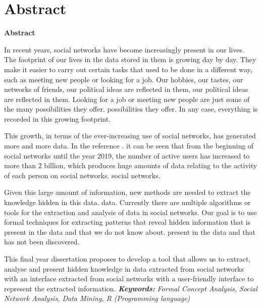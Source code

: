 \documentclass[../main.tex]{subfiles}
\begin{document}
\makeatletter
\renewenvironment{abstract}{%
    \if@twocolumn
      \section*{Abstract \\}%
    \else %
    \begin{flushright}
        {\filleft\Huge\bfseries\fontsize{48pt}{12}\selectfont Abstract\vspace{\z@}}%
        \end{flushright}
      \quotation
    \fi}
    {\if@twocolumn\else\endquotation\fi}
\makeatother
\begin{abstract}

In recent years, social networks have become increasingly present in our lives. The footprint of our lives in the data stored in them is growing day by day. They make it easier to carry out certain tasks that used to be done in a different way, such as meeting new people or looking for a job. Our hobbies, our tastes, our networks of friends, our political ideas are reflected in them, our political ideas are reflected in them. Looking for a job or meeting new people are just some of the many possibilities they offer. possibilities they offer. In any case, everything is recorded in this growing footprint. 

This growth, in terms of the ever-increasing use of social networks, has generated more and more data. In the reference \cite{risesn}. it can be seen that from the beginning of social networks until the year 2019, the number of active users has increased to more than 2 billion, which produces huge amounts of data relating to the activity of each person on social networks. social networks. 

Given this large amount of information, new methods are needed to extract the knowledge hidden in this data. data. Currently there are multiple algorithms or tools for the extraction and analysis of data in social networks. Our goal is to use formal techniques for extracting patterns that reveal hidden information that is present in the data and that we do not know about. present in the data and that has not been discovered.

This final year dissertation proposes to develop a tool that allows us to extract, analyse and present hidden knowledge in data extracted from social networks with an interface extracted from social networks with a user-friendly interface to represent the extracted information. \newline\newline
\noindent\textit{\textbf{Keywords:} Formal Concept Analysis, Social Network Analysis, Data Mining, R (Programming language)}
\end{abstract}
\end{document}
